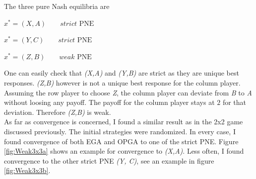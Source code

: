 The three pure Nash equilibria are

\begin{description}\centering
    \item $x^{*} = (X,A) \qquad \textit{strict }\text{PNE}$
    \item $x^{*} = (Y,C) \qquad \textit{strict }\text{PNE}$
    \item $x^{*} = (Z,B) \qquad \textit{weak }\text{PNE}$
\end{description}

One can easily check that \textit{(X,A)} and \textit{(Y,B)} are strict as they are unique best responses. \textit{(Z,B)} however is not a unique best response for the column player. Assuming the row player to choose \textit{Z}, the column player can deviate from \textit{B} to \textit{A} without loosing any payoff. The payoff for the column player stays at $2$ for that deviation. Therefore \textit{(Z,B)} is weak. \\

As far as convergence is concerned, I found a similar result as in the 2x2 game discussed previously. The initial strategies were randomized. In every case, I found convergence of both EGA and OPGA to one of the strict PNE. Figure \ref{fig:Weak3x3a} shows an example for convergence to \textit{(X,A)}. Less often, I found convergence to the other strict PNE \textit{(Y, C)}, see an example in figure \ref{fig:Weak3x3b}. 

